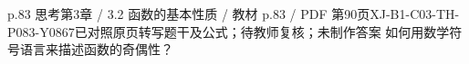 \par\noindent\begin{minipage}{\linewidth}
\begin{bankitem}{p.83 思考}{第3章 / 3.2 函数的基本性质 / 教材 p.83 / PDF 第90页}{XJ-B1-C03-TH-P083-Y0867}{已对照原页转写题干及公式；待教师复核；未制作答案}
如何用数学符号语言来描述函数的奇偶性？
\end{bankitem}
\end{minipage}\par\medskip

